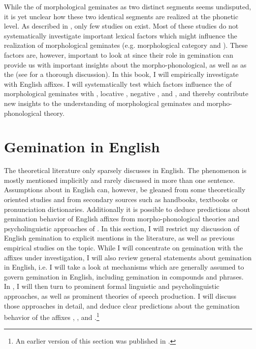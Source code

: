 While the  of  morphological geminates as two distinct segments seems undisputed, it is yet unclear how these two identical segments are realized at the phonetic level. As described in , only few studies on  exist. Most of these studies do not systematically investigate important lexical factors which might influence the realization of  morphological geminates (e.g. morphological category and ). These factors are, however, important to look at since their role in {gemination} can provide us with important insights about the morpho-phonological, as well as as the  (see  for a thorough discussion). 
In this book, I will empirically investigate  with English affixes. I will systematically test which factors influence the  of  morphological geminates with , locative , negative ,  and , and thereby contribute new insights to the understanding of  morphological geminates and morpho-phonological theory.


\section{Gemination in English} \label{Gemination in English}

The theoretical literature only sparsely discusses  in English. The phenomenon is mostly mentioned implicitly and rarely discussed in more than one sentence.  Assumptions about  in English can, however, be gleaned from some  theoretically oriented studies and from secondary sources such as handbooks, textbooks or pronunciation dictionaries. Additionally it is possible to deduce predictions about gemination behavior of English affixes from morpho-phonological theories and psycholinguistic approaches of . In this section, I will restrict my discussion of English gemination to explicit mentions in the literature, as well as previous empirical studies on the topic. While I will concentrate on gemination with the affixes under investigation, I will also review general statements about gemination in English, i.e. I will take a look at mechanisms which are generally assumed to govern gemination in English, including gemination in compounds and phrases.
In , I will then turn to prominent formal linguistic and psycholinguistic approaches, as well as prominent theories of speech production. I will discuss those approaches in detail, and deduce clear predictions about the gemination behavior of the affixes , ,  and .\footnote{An earlier version of this section was published in \cite{BenHedia.2017}.}
\label{assumptions}
 

